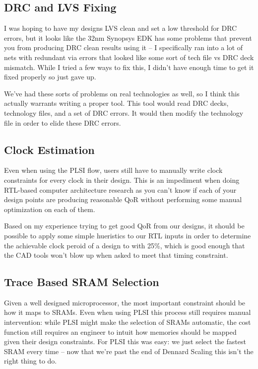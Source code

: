 \documentclass{article}
\begin{document}
\subsection{DRC and LVS Fixing}

I was hoping to have my designs LVS clean and set a low threshold for DRC
errors, but it looks like the 32nm Synopsys EDK has some problems that prevent
you from producing DRC clean results using it -- I specifically ran into a lot
of nets with redundant via errors that looked like some sort of tech file vs
DRC deck mismatch.  While I tried a few ways to fix this, I didn't have enough
time to get it fixed properly so just gave up.

We've had these sorts of problems on real technologies as well, so I think this
actually warrants writing a proper tool.  This tool would read DRC decks,
technology files, and a set of DRC errors.  It would then modify the technology
file in order to elide these DRC errors.

\subsection{Clock Estimation}

Even when using the PLSI flow, users still have to manually write clock
constraints for every clock in their design.  This is an impediment when doing
RTL-based computer architecture research as you can't know if each of your
design points are producing reasonable QoR without performing some manual
optimization on each of them.

Based on my experience trying to get good QoR from our designs, it should be
possible to apply some simple hueristics to our RTL inputs in order to
determine the achievable clock peroid of a design to with 25\%, which is good
enough that the CAD tools won't blow up when asked to meet that timing
constraint.

\subsection{Trace Based SRAM Selection}

Given a well designed microprocessor, the most important constraint should be
how it maps to SRAMs.  Even when using PLSI this process still requires manual
intervention: while PLSI might make the selection of SRAMs automatic, the cost
function still requires an engineer to intuit how memories should be mapped
given their design constraints.  For PLSI this was easy: we just select the
fastest SRAM every time -- now that we're past the end of Dennard Scaling this
isn't the right thing to do.
\end{document}
